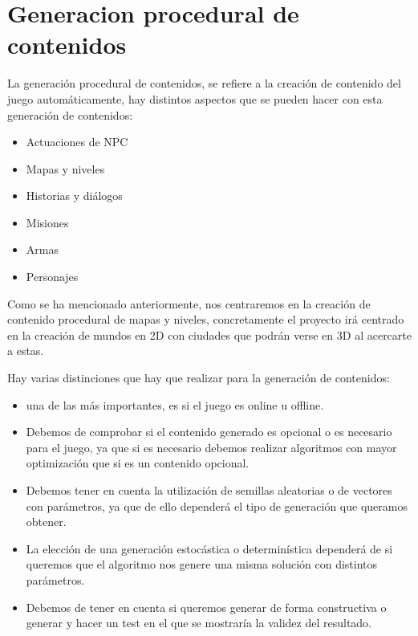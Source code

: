 \chapter[Generacion procedural de contenidos]{\label{identificadorReferenciaCruzada}
Generacion procedural de contenidos}

La generación procedural de contenidos, se refiere a la creación de contenido del juego automáticamente, hay distintos aspectos que se pueden hacer con esta generación de contenidos\cite{B1}:

\begin{itemize}
	\item Actuaciones de NPC
	\item Mapas y niveles
	\item Historias y diálogos
	\item Misiones
	\item Armas
	\item Personajes
\end{itemize}


Como se ha mencionado anteriormente, nos centraremos en la creación de contenido procedural de mapas y niveles, concretamente el proyecto irá centrado en la creación de mundos en 2D con ciudades que podrán verse en 3D al acercarte a estas.

Hay varias distinciones que hay que realizar para la generación de contenidos\cite{B2}:

\begin{itemize}

\item una de las más importantes, es si el juego es online u offline\cite{B2}.

\item Debemos de comprobar si el contenido generado es opcional o es necesario para el juego, ya que si es necesario debemos realizar algoritmos con mayor optimización que si es un contenido opcional\cite{B2}.

\item Debemos tener en cuenta la utilización de  semillas aleatorias o de vectores con parámetros, ya que de ello dependerá el tipo de generación que queramos obtener\cite{B2}.

\item La elección de una generación estocástica o determinística dependerá de si queremos que el algoritmo nos genere una misma solución con distintos parámetros\cite{B2}.

\item Debemos de tener en cuenta si queremos generar de forma constructiva o generar y hacer un test en el que se mostraría la validez del resultado\cite{B2}.

\end{itemize}

